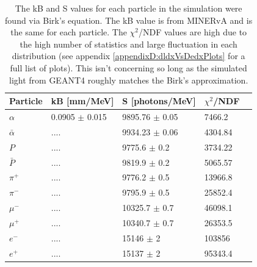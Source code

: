 \begin{table}[!h]
\centering
\begin{tabular}{lllll}  
\toprule
Particle       & kB [mm/MeV]        & S [photons/MeV]    & $\chi^2$/NDF\\
\midrule
$\alpha$       & 0.0905 $\pm$ 0.015 & 9895.76 $\pm$ 0.05 & 7466.2  \\
$\bar{\alpha}$ & ....               & 9934.23 $\pm$ 0.06 & 4304.84 \\
$P$            & ....               & 9775.6  $\pm$ 0.2  & 3734.22 \\
$\bar{P}$      & ....               & 9819.9  $\pm$ 0.2  & 5065.57 \\
$\pi^+$        & ....               & 9776.2  $\pm$ 0.5  & 13966.8 \\
$\pi^-$        & ....               & 9795.9  $\pm$ 0.5  & 25852.4 \\
$\mu^-$        & ....               & 10325.7 $\pm$ 0.7  & 46098.1 \\
$\mu^+$        & ....               & 10340.7 $\pm$ 0.7  & 26353.5 \\
$e^-$          & ....               & 15146   $\pm$ 2    & 103856  \\
$e^+$          & ....               & 15137   $\pm$ 2    & 95343.4 \\
\bottomrule  
\end{tabular}
\caption{The kB and S values for each particle in the simulation were found via Birk's equation. The kB value is from MINERvA and is the same for each particle. The $\chi^2$/NDF values are high due to the high number of statistics and large fluctuation in each distribution (see appendix  \ref{appendixD:dldxVsDedxPlots} for a full list of plots). This isn't concerning so long as the simulated light from GEANT4 roughly matches the Birk's approximation.}
\label{tab:sValueTable}
\end{table}

